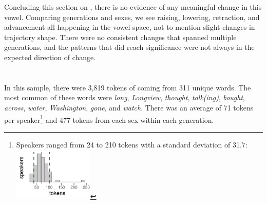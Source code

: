 Concluding this section on \lot, there is no evidence of any meaningful change in this vowel. Comparing generations and sexes, we see raising, lowering, retraction, and advancement all happening in the vowel space, not to mention slight changes in trajectory shape. There were no consistent changes that spanned multiple generations, and the patterns that did reach significance were not always in the expected direction of change.




\section{\thought}
\label{BOUGHT}

In this sample, there were 3,819 tokens of \thought coming from 311 unique words. The most common of these words were \textit{long}, \textit{Longview}, \textit{thought}, \textit{talk(ing)}, \textit{bought}, \textit{across}, \textit{water}, \textit{Washington}, \textit{gone}, and \textit{watch}. There was an average of 71 tokens per speaker\footnote{Speakers ranged from 24 to 210 tokens with a standard deviation of 31.7: \includegraphics[width = 1.5in]{Figures/BOUGHT/BOUGHT_tiny.pdf}} and 477 tokens from each sex within each generation.




